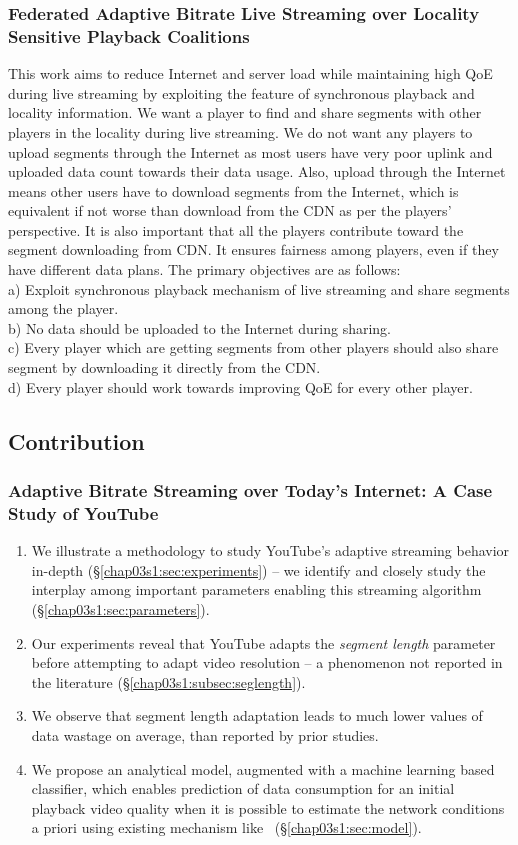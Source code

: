 \subsubsection{Federated Adaptive Bitrate Live
	Streaming over Locality Sensitive
	Playback Coalitions}
This work aims to reduce Internet and server load while maintaining high QoE during live streaming by exploiting the feature of synchronous playback and locality information. We want a player to find and share segments with other players in the locality during live streaming. We do not want any players to upload segments through the Internet as most users have very poor uplink and uploaded data count towards their data usage. Also, upload through the Internet means other users have to download segments from the Internet, which is equivalent if not worse than download from the CDN as per the players' perspective. It is also important that all the players contribute toward the segment downloading from CDN. It ensures fairness among players, even if they have different data plans. The primary objectives are as follows: \\
a) Exploit synchronous playback mechanism of live streaming and share segments among the player.\\
b) No data should be uploaded to the Internet during sharing.\\
c) Every player which are getting segments from other players should also share segment by downloading it directly from the CDN. \\
d) Every player should work towards improving QoE for every other player.

\subsection{Contribution}
\subsubsection{Adaptive Bitrate Streaming over Today's Internet: A Case Study of YouTube}
\begin{enumerate}
	\item We illustrate a methodology to study YouTube's adaptive streaming behavior in-depth (\S\ref{chap03s1:sec:experiments}) -- we identify and closely study the interplay among important parameters enabling this streaming algorithm (\S\ref{chap03s1:sec:parameters}).
	\item Our experiments reveal that YouTube adapts the {\it segment length} parameter before attempting to adapt video resolution -- a phenomenon not reported in the literature (\S\ref{chap03s1:subsec:seglength}).
	\item We observe that segment length adaptation leads to much lower values of data wastage on average, than reported by prior studies.
	\item We propose an analytical model, augmented with a machine learning based classifier, which enables prediction of data consumption for an initial playback video quality when it is possible to estimate the network conditions a priori using existing mechanism like~\cite{Zou2015}  (\S\ref{chap03s1:sec:model}).
\end{enumerate}

